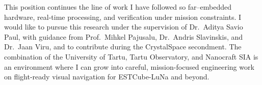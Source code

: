 \documentclass[a4paper,12pt]{article}
\begin{document}
This position continues the line of work I have followed so far--embedded hardware, real-time processing, and verification under mission constraints. I would like to pursue this research under the supervision of Dr.\ Aditya Savio Paul, with guidance from Prof.\ Mihkel Pajusalu, Dr.\ Andris Slavinskis, and Dr.\ Jaan Viru, and to contribute during the CrystalSpace secondment. The combination of the University of Tartu, Tartu Observatory, and Nanocraft SIA is an environment where I can grow into careful, mission-focused engineering work on flight-ready visual navigation for ESTCube-LuNa and beyond.
\end{document}
